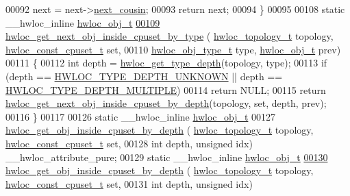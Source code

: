 \begin{DoxyCode}
00092     next = next->\hyperlink{a00238_a85a788017457129589318b6c39451acf}{next\_cousin};
00093   \textcolor{keywordflow}{return} next;
00094 \}
00095 
00108 \textcolor{keyword}{static} \_\_hwloc\_inline \hyperlink{a00238}{hwloc\_obj\_t}
\hyperlink{a00195_gafe859176cf9233f215fea0e87cef47e7}{00109} \hyperlink{a00195_gafe859176cf9233f215fea0e87cef47e7}{hwloc\_get\_next\_obj\_inside\_cpuset\_by\_type} (
      \hyperlink{a00186_ga9d1e76ee15a7dee158b786c30b6a6e38}{hwloc\_topology\_t} topology, \hyperlink{a00183_ga1f784433e9b606261f62d1134f6a3b25}{hwloc\_const\_cpuset\_t} \textcolor{keyword}{set},
00110                                           \hyperlink{a00184_gacd37bb612667dc437d66bfb175a8dc55}{hwloc\_obj\_type\_t} type, 
      \hyperlink{a00238}{hwloc\_obj\_t} prev)
00111 \{
00112   \textcolor{keywordtype}{int} depth = \hyperlink{a00187_ga8bec782e21be313750da70cf7428b374}{hwloc\_get\_type\_depth}(topology, type);
00113   \textcolor{keywordflow}{if} (depth == \hyperlink{a00187_ggaf4e663cf42bbe20756b849c6293ef575a0565ab92ab72cb0cec91e23003294aad}{HWLOC\_TYPE\_DEPTH\_UNKNOWN} || depth == 
      \hyperlink{a00187_ggaf4e663cf42bbe20756b849c6293ef575ae99465995cacde6c210d5fc2e409798c}{HWLOC\_TYPE\_DEPTH\_MULTIPLE})
00114     \textcolor{keywordflow}{return} NULL;
00115   \textcolor{keywordflow}{return} \hyperlink{a00195_ga63e3784e7c60fbae5073428cb98ac787}{hwloc\_get\_next\_obj\_inside\_cpuset\_by\_depth}(topology, \textcolor{keyword}{set}, 
      depth, prev);
00116 \}
00117 
00126 \textcolor{keyword}{static} \_\_hwloc\_inline \hyperlink{a00238}{hwloc\_obj\_t}
00127 \hyperlink{a00195_gaec86f1f88832836e3f9338e246ea5862}{hwloc\_get\_obj\_inside\_cpuset\_by\_depth} (
      \hyperlink{a00186_ga9d1e76ee15a7dee158b786c30b6a6e38}{hwloc\_topology\_t} topology, \hyperlink{a00183_ga1f784433e9b606261f62d1134f6a3b25}{hwloc\_const\_cpuset\_t} \textcolor{keyword}{set},
00128                                       \textcolor{keywordtype}{int} depth, \textcolor{keywordtype}{unsigned} idx) \_\_hwloc\_attribute\_pure;
00129 \textcolor{keyword}{static} \_\_hwloc\_inline \hyperlink{a00238}{hwloc\_obj\_t}
\hyperlink{a00195_gaec86f1f88832836e3f9338e246ea5862}{00130} \hyperlink{a00195_gaec86f1f88832836e3f9338e246ea5862}{hwloc\_get\_obj\_inside\_cpuset\_by\_depth} (
      \hyperlink{a00186_ga9d1e76ee15a7dee158b786c30b6a6e38}{hwloc\_topology\_t} topology, \hyperlink{a00183_ga1f784433e9b606261f62d1134f6a3b25}{hwloc\_const\_cpuset\_t} \textcolor{keyword}{set},
00131                                       \textcolor{keywordtype}{int} depth, \textcolor{keywordtype}{unsigned} idx)

\end{DoxyCode}
